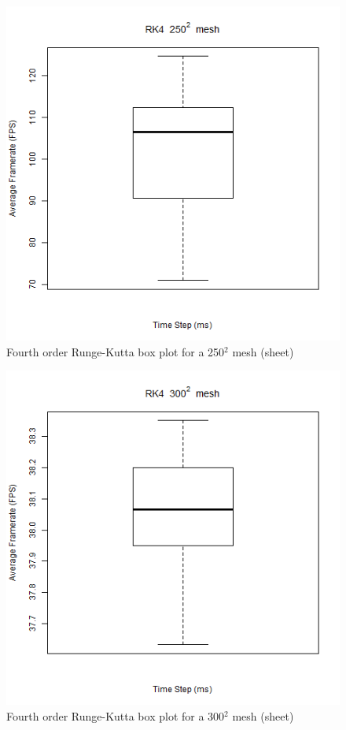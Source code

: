       \begin{figure}
    \begin{center}
      \includegraphics[scale=.9]{Figures/sheet_rk4_250_box}
    \end{center}
    \caption{Fourth order Runge-Kutta box plot for a 250$^{2}$ mesh (sheet)}
    \label{fig:rk4 box 250 sheet}
  \end{figure}
  
      \begin{figure}
    \begin{center}
      \includegraphics[scale=.9]{Figures/sheet_rk4_300_box}
    \end{center}
    \caption{Fourth order Runge-Kutta box plot for a 300$^{2}$ mesh (sheet)}
    \label{fig:rk4 box 300 sheet}
  \end{figure}

